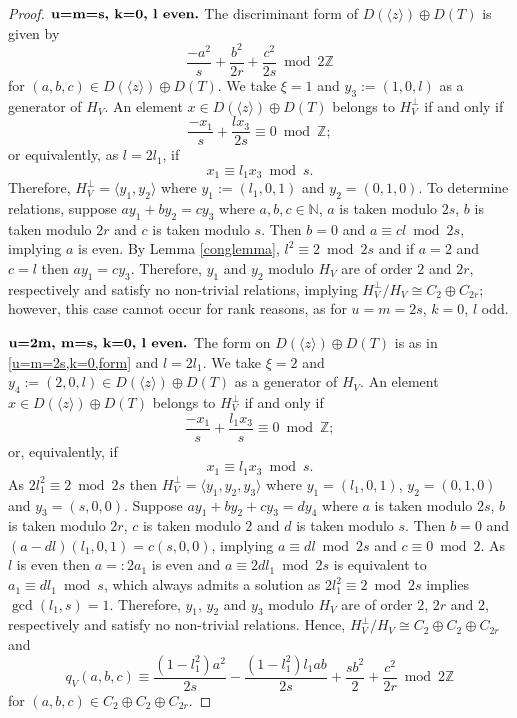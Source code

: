 \documentclass[12pt, a4paper]{article}
\newcommand{\ZZ}{\mathbb{Z}}
\newcommand{\NN}{\mathbb{N}}
\newcommand{\la}{\langle}
\newcommand{\ra}{\rangle}
\newcommand{\opn}{\operatorname}
\newcommand{\op}{\oplus}
\begin{document}
\begin{proof}
  \noindent $\textbf{u=m=s, k=0, l \text{even}.}$ 
  The discriminant form of $D(\la z \ra) \op D(T)$ is given by
\[
  \frac{-a^2}{s} +  \frac{b^2}{2r} + \frac{c^2}{2s}  \bmod{ 2\ZZ}
  \]
for $(a,b,c) \in D(\la z \ra) \op D(T)$.
  We take $\xi = 1$ and $y_3:=(1,0,l)$ as a generator of $H_V$.
  An element $x \in D(\la z \ra) \op D(T)$ belongs to $H_V^{\perp}$ if and only if
\[
  \frac{-x_1}{s} + \frac{l x_3}{2s} \equiv 0 \bmod{ \ZZ};
  \]
or equivalently, as $l=2l_1$, if
  \begin{equation*}
    x_1 \equiv l_1 x_3 \bmod{ s}.
  \end{equation*}
  Therefore, $H_V^{\perp} = \la y_1, y_2 \ra$ where $y_1:=(l_1, 0, 1)$ and $y_2 = (0, 1, 0)$.
To determine relations, suppose $a y_1 + b y_2 = c y_3$ where $a,b,c \in \NN$,
  $a$ is taken modulo $2s$,
  $b$ is taken modulo $2r$
  and $c$ is taken modulo $s$.
  Then $b = 0$ and $a \equiv cl \bmod{2s}$, implying $a$ is even.
  By Lemma \ref{conglemma}, $l^2 \equiv 2 \bmod{ 2s}$ and if $a=2$ and $c=l$ then $a y_1 = c y_3$.
  Therefore, $y_1$ and $y_2$ modulo $H_V$ are of order $2$ and $2r$, respectively and satisfy no non-trivial relations, implying $H_V^{\perp}/H_V \cong C_2 \op C_{2r}$; however, this case cannot occur for rank reasons, as for $u=m=2s$, $k=0$, $l$ odd.




  \noindent $\textbf{u=2m, m=s, k=0, l \text{even}.}$ 
  The form on $D(\la z \ra) \op D(T)$ is as in \eqref{u=m=2s,k=0,form} and $l=2l_1$.
  We take $\xi=2$ and $y_4 := (2,0,l) \in D(\la z \ra) \op D(T)$ as a generator of $H_V$. 
  An element $x \in D(\la z \ra) \op D(T)$ belongs to $H_V^{\perp}$ if and only if
\[
  \frac{-x_1}{s} + \frac{l_1 x_3}{s} \equiv 0 \bmod{ \ZZ};
  \]
or, equivalently, if
  \begin{equation*}
    x_1 \equiv l_1 x_3 \bmod{ s}.
  \end{equation*}
  As $2l_1^2 \equiv 2 \bmod{ 2s}$ then
  $H_V^{\perp} = \la y_1, y_2, y_3 \ra$ where
  $y_1 = (l_1, 0, 1)$,
  $y_2=(0,1,0)$ and 
  $y_3=(s,0,0)$.
  Suppose $a y_1 + b y_2 + c y_3 = d y_4$ where
  $a$ is taken modulo $2s$,
  $b$ is taken modulo $2r$,
  $c$ is taken modulo $2$ and
  $d$ is taken modulo $s$.
  Then $b=0$ and $(a-dl)(l_1,0,1) = c(s,0,0)$, implying $a \equiv dl \bmod{ 2s}$ and $c \equiv 0 \bmod{ 2}$.
  As $l$ is even then $a=:2a_1$ is even and $a \equiv 2dl_1 \bmod{ 2s}$ is equivalent to $a_1 \equiv d l_1 \bmod{ s}$, which always admits a solution as $2l_1^2 \equiv 2 \bmod{ 2s}$ implies $\opn{gcd}(l_1, s)=1$.
  Therefore, $y_1$, $y_2$ and $y_3$ modulo $H_V$ are of order $2$, $2r$ and $2$, respectively and satisfy no non-trivial relations.
  Hence, $H_V^{\perp}/H_V \cong C_2 \op C_2 \op C_{2r}$ and
  \[
  q_V(a,b,c) \equiv 
  \frac{(1-l_1^2)a^2}{2s}
  -
  \frac{(1-l_1^2)l_1 ab}{2s}
  + \frac{sb^2}{2}
  +
  \frac{c^2}{2r} \bmod{ 2 \ZZ}
  \]
  for $(a,b,c) \in C_2 \op C_2 \op C_{2r}$.
  

\end{proof}
\end{document}
